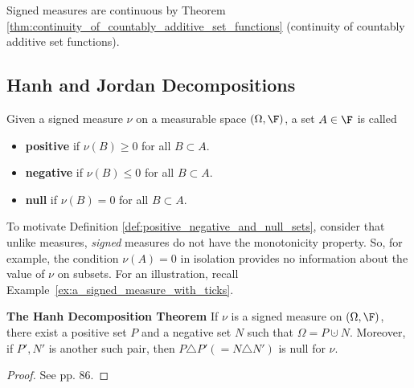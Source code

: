 \documentclass{article} %
\begin{document}
\begin{remark}
Signed measures are continuous by Theorem \ref{thm:continuity_of_countably_additive_set_functions} (continuity of countably additive set functions).
\end{remark}

\subsection{Hanh and Jordan Decompositions}

\begin{definition}
Given a signed measure $\nu$ on a measurable space $(\Omega, \F)$, a set $A \in \F$ is called
\begin{itemize}
\item \textbf{positive} if $\nu(B) \geq 0$ for all $B \subset A$.
\item \textbf{negative} if $\nu(B) \leq 0$ for all $B \subset A$.
\item \textbf{null}	if $\nu(B) = 0$ for all $B \subset A$.
\end{itemize}
\label{def:positive_negative_and_null_sets}
\end{definition}

\begin{remark}
To motivate Definition \ref{def:positive_negative_and_null_sets}, consider that unlike measures, \textit{signed} measures do not have the monotonicity property. So, for example, the condition $\nu(A)=0$ in isolation provides no information about the value of $\nu$ on subsets. For an illustration, recall  Example~\ref{ex:a_signed_measure_with_ticks}.
\end{remark}

\begin{theorem}{\textbf{The Hanh Decomposition Theorem}}
If $\nu$ is a signed measure on $(\Omega, \F)$, there exist a positive set $P$ and a negative set $N$ such that $\Omega = P \cupdot N$.  Moreover, if $P',N'$ is another such pair, then $P \triangle P' (= N \triangle N')$ is null for $\nu$.
\label{thm:hanh_decomposition}
\end{theorem}

\begin{proof}
See \cite{folland1999real} pp. 86.	
\end{proof}
\end{document}
